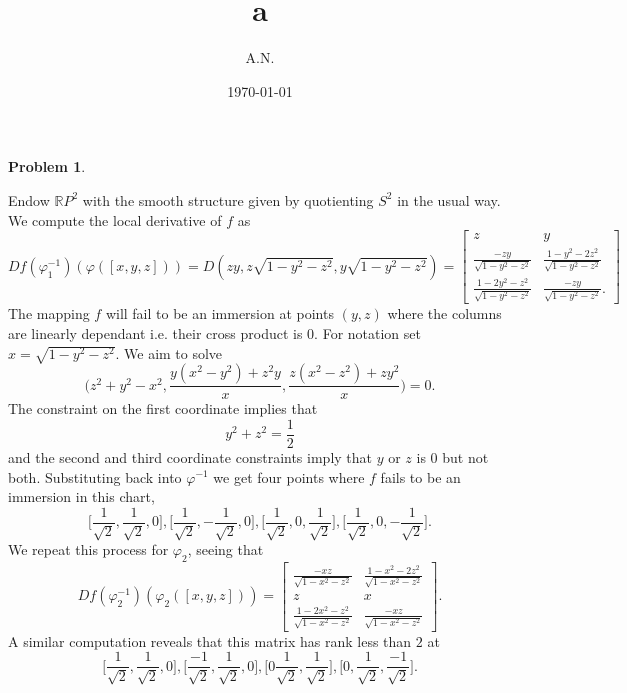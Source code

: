 \documentclass[12pt, a4paper]{article}
\title{a}
\author{A.N.}
\date{\today}
\newtheorem{problem}{Problem}
\theoremstyle{definition}
\newcommand{\R}{\mathbb{R}}                           %
\newcommand{\vph}{\varphi}
\begin{document}
	\begin{problem}
	\end{problem}
Endow $\R P^2$ with the smooth structure given by quotienting $S^2$ in the usual way. We compute the local derivative of $f$ as 
$$Df(\vph_1^{-1})(\vph([x,y,z]))  = D(zy, z\sqrt{1-y^2-z^2} , y \sqrt{1-y^2-z^2}) = \begin{bmatrix}
	z & y \\ \frac{-zy}{\sqrt{1-y^2-z^2}} & \frac{1-y^2-2z^2}{\sqrt{1-y^2-z^2}} \\ \frac{1-2y^2 - z^2}{\sqrt{1-y^2-z^2}} & \frac{-zy}{\sqrt{1-y^2-z^2}}.
\end{bmatrix}$$
The mapping $f$ will fail to be an immersion at points $(y,z)$ where the columns are linearly dependant i.e. their cross product is 0. For notation set $x = \sqrt{1-y^2-z^2}$. We aim to solve $$\Big(z^2+y^2 -x^2, \frac{y(x^2-y^2) + z^2y}{x} , \frac{z(x^2-z^2) + zy^2}{x} \Big) = 0.$$
The constraint on the first coordinate implies that $$y^2+z^2=\frac{1}{2}$$ and the second and third coordinate constraints imply that $y$ or $z$ is 0 but not both. Substituting back into $\vph^{-1}$ we get four points where $f$ fails to be an immersion in this chart, $$\Big[\frac{1}{\sqrt{2}}, \frac{1}{\sqrt{2}} ,0 \Big], \Big[\frac{1}{\sqrt{2}} , - \frac{1}{\sqrt{2}}, 0 \Big], \Big[\frac{1}{\sqrt{2}} , 0,  \frac{1}{\sqrt{2}} \Big], \Big[\frac{1}{\sqrt{2}} , 0 ,  - \frac{1}{\sqrt{2}} \Big]. $$
We repeat this process for $\vph_2$, seeing that $$Df(\vph_2^{-1})(\vph_2([x,y,z])) = \begin{bmatrix}
	\frac{-xz}{\sqrt{1-x^2-z^2}} & \frac{1-x^2-2z^2}{\sqrt{1-x^2-z^2}} \\ z & x \\ \frac{1-2x^2-z^2}{\sqrt{1-x^2-z^2}} & \frac{-xz}{\sqrt{1-x^2-z^2}} 
\end{bmatrix}.$$
A similar computation reveals that this matrix has rank less than $2$ at $$ \Big[ \frac{1}{\sqrt{2}}, \frac{1}{\sqrt{2}} , 0 \Big], \Big[\frac{-1}{\sqrt{2}}, \frac{1}{\sqrt{2}} , 0 \Big] , \Big[0 \frac{1}{\sqrt{2}} , \frac{1}{\sqrt{2}} \Big], \Big[ 0, \frac{1}{\sqrt{2}}, \frac{-1}{\sqrt{2}}\Big] . $$
\end{document}
